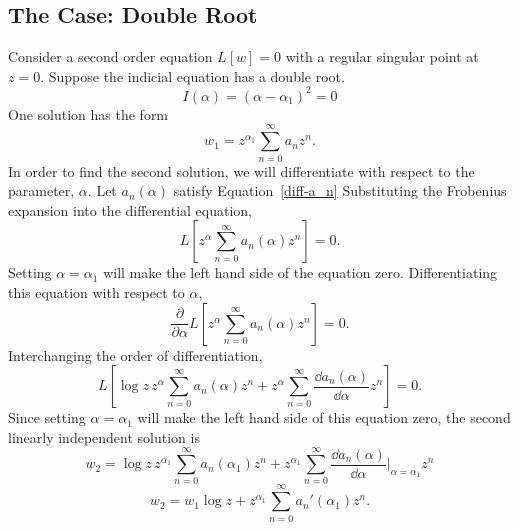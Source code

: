 \subsection{The Case: Double Root}
Consider a second order equation $L[w] = 0$ with a regular singular point
at $z = 0$.  Suppose the indicial equation has a double root.
\[ I(\alpha) = (\alpha-\alpha_1)^2 = 0\]
One solution has the form
\[ w_1 = z^{\alpha_1} \sum_{n=0}^\infty a_n z^n.\]
In order to find the second solution, we will differentiate with respect to the 
parameter, $\alpha$.  Let $a_n(\alpha)$ satisfy Equation~\ref{diff-a_n}
Substituting the Frobenius expansion into the differential equation,
\[ L\left[z^\alpha \sum_{n=0}^\infty a_n(\alpha) z^n\right] = 0.\]
Setting $\alpha=\alpha_1$ will make the left hand side of the equation zero.
Differentiating this equation with respect to $\alpha$,
\[ \frac{\partial}{\partial \alpha}L\left[z^\alpha \sum_{n=0}^\infty a_n(\alpha) z^n\right] 
= 0.\]
Interchanging the order of differentiation,
\[ L\left[ \log z\,z^\alpha \sum_{n=0}^\infty a_n(\alpha) z^n
  + z^\alpha \sum_{n=0}^\infty \frac{\dd a_n(\alpha)}{\dd \alpha} z^n \right]
= 0.\]
Since setting $\alpha = \alpha_1$ will make the left hand side of this 
equation zero, the second linearly independent solution is
\[ w_2 = \log z\, z^{\alpha_1} \sum_{n=0}^\infty a_n(\alpha_1) z^n
+ z^{\alpha_1} \sum_{n=0}^\infty \frac{\dd a_n(\alpha)}{\dd \alpha} 
\Bigg|_{\alpha=\alpha_1} z^n  \]
\[ \boxed{ w_2 = w_1 \log z
  + z^{\alpha_1} \sum_{n=0}^\infty a_n'(\alpha_1)
  z^n .} \]














